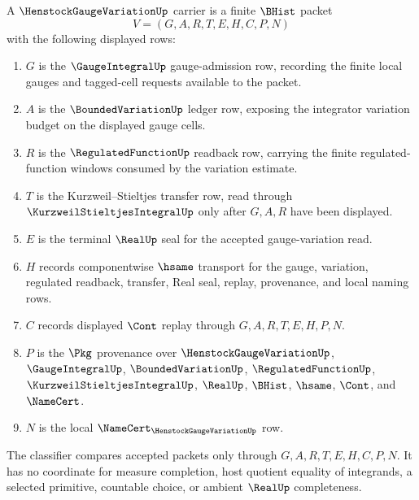 \begin{definition}
\label{def:henstock-gauge-variation-carrier}
A $\HenstockGaugeVariationUp$ carrier is a finite $\BHist$ packet
$$
V=(G,A,R,T,E,H,C,P,N)
$$
with the following displayed rows:
\begin{enumerate}
\item $G$ is the $\GaugeIntegralUp$ gauge-admission row, recording the finite local gauges and tagged-cell requests available to the packet.
\item $A$ is the $\BoundedVariationUp$ ledger row, exposing the integrator variation budget on the displayed gauge cells.
\item $R$ is the $\RegulatedFunctionUp$ readback row, carrying the finite regulated-function windows consumed by the variation estimate.
\item $T$ is the Kurzweil--Stieltjes transfer row, read through $\KurzweilStieltjesIntegralUp$ only after $G,A,R$ have been displayed.
\item $E$ is the terminal $\RealUp$ seal for the accepted gauge-variation read.
\item $H$ records componentwise $\hsame$ transport for the gauge, variation, regulated readback, transfer, Real seal, replay, provenance, and local naming rows.
\item $C$ records displayed $\Cont$ replay through $G,A,R,T,E,H,P,N$.
\item $P$ is the $\Pkg$ provenance over $\HenstockGaugeVariationUp$, $\GaugeIntegralUp$, $\BoundedVariationUp$, $\RegulatedFunctionUp$, $\KurzweilStieltjesIntegralUp$, $\RealUp$, $\BHist$, $\hsame$, $\Cont$, and $\NameCert$.
\item $N$ is the local $\NameCert_{\HenstockGaugeVariationUp}$ row.
\end{enumerate}
The classifier compares accepted packets only through $G,A,R,T,E,H,C,P,N$. It has no coordinate for measure completion, host quotient equality of integrands, a selected primitive, countable choice, or ambient $\RealUp$ completeness.
\end{definition}

